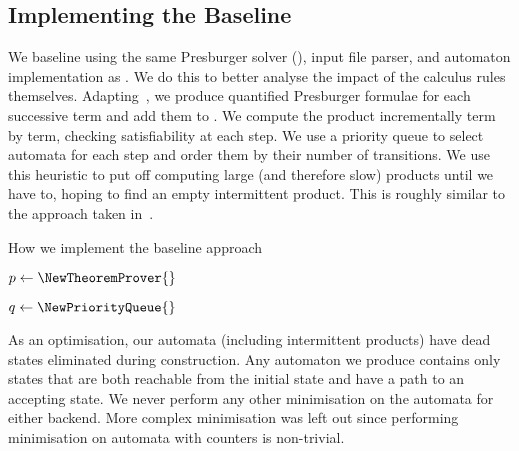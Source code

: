 \subsection{Implementing the Baseline}\label{sec:implementing-baseline}

We baseline using the same Presburger solver (\Princess{}), input file parser,
and automaton implementation as \Catra. We do this to better analyse the impact
of the calculus rules themselves. Adapting~\cite{generate-parikh-image}, we
produce quantified Presburger formulae for each successive term and add them to
\Princess. We compute the product incrementally term by term, checking
satisfiability at each step. We use a priority queue to select automata for each
step and order them by their number of transitions. We use this heuristic to put
off computing large (and therefore slow) products until we have to, hoping to
find an empty intermittent product. This is roughly similar to the approach
taken in~\cite{approximate-parikh}.

\begin{algorithm}
  \caption{How we implement the baseline approach}\label{alg:baseline}

  $p \gets \NewTheoremProver{}$



  $q \gets \NewPriorityQueue{}$


  

  \end{algorithm}

As an optimisation, our automata (including intermittent products) have dead
states eliminated during construction. Any automaton we produce contains only
states that are both reachable from the initial state and have a path to an
accepting state. We never perform any other minimisation on the automata for
either backend. More complex minimisation was left out since performing
minimisation on automata with counters is non-trivial.

